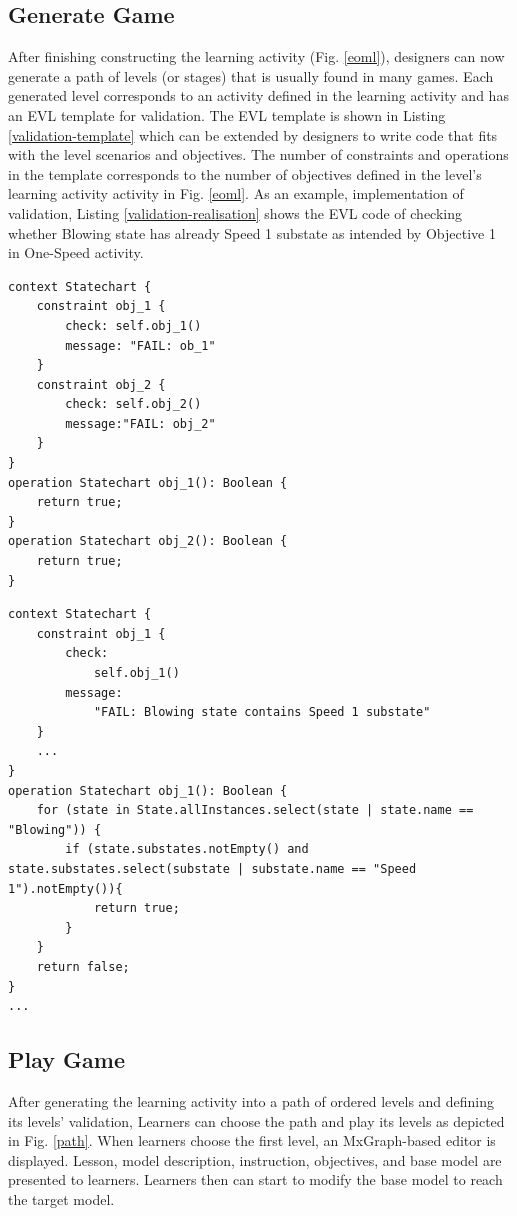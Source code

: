 \documentclass[conference]{IEEEtran}
\begin{document}
\subsection{Generate Game}
After finishing constructing the learning activity (Fig. \ref{eoml}), designers can now generate a path of levels (or stages) that is usually found in many games. Each generated level corresponds to an activity defined in the learning activity and has an EVL template for validation. The EVL template is shown in Listing \ref{validation-template} which can be extended by designers to write code that fits with the level scenarios and objectives. The number of constraints and operations in the template corresponds to the number of objectives defined in the level's learning activity activity in Fig. \ref{eoml}. As an example, implementation of validation, Listing \ref{validation-realisation} shows the EVL code of checking whether Blowing state has already Speed 1 substate as intended by Objective 1 in One-Speed activity.   

\begin{lstlisting}[style=interfaces,caption={Validation template for objectives in One-Speed Fan activity/level.},label=validation-template]
context Statechart {
    constraint obj_1 {
        check: self.obj_1()
        message: "FAIL: ob_1"
    }
    constraint obj_2 {
        check: self.obj_2()
        message:"FAIL: obj_2"
    }        
}
operation Statechart obj_1(): Boolean {
    return true;
}
operation Statechart obj_2(): Boolean {
    return true;
}
\end{lstlisting} 


\begin{lstlisting}[style=interfaces,caption={Validation realisation for Objective 1 in One-Speed Fan activity/level.}, label=validation-realisation]
context Statechart {
    constraint obj_1 {
        check: 
            self.obj_1()
        message:
            "FAIL: Blowing state contains Speed 1 substate"
    }
    ...
}
operation Statechart obj_1(): Boolean {
    for (state in State.allInstances.select(state | state.name == "Blowing")) {
        if (state.substates.notEmpty() and state.substates.select(substate | substate.name == "Speed 1").notEmpty()){
            return true;
        }        
    }
    return false;
}
...
\end{lstlisting} 

\subsection{Play Game}
After generating the learning activity into a path of ordered levels and defining its levels' validation, Learners can choose the path and play its levels as depicted in Fig. \ref{path}. When learners choose the first level, an MxGraph-based editor is displayed. Lesson, model description, instruction, objectives, and base model are presented to learners. Learners then can start to modify the base model to reach the target model. 
\end{document}
